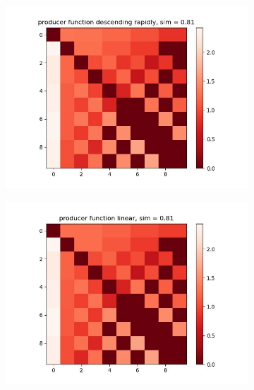 \documentclass[11pt, letterpaper]{article}
\begin{document}
\begin{figure}[h]
    \centering
\begin{adjustbox}{max width=1.5\textwidth,center}
    \begin{subfigure}[b]{0.45\textwidth}
        \includegraphics[width=\linewidth]{"figures/g/descending rapidly_heatmap.jpg"}
    \end{subfigure}
    \begin{subfigure}[b]{0.45\textwidth}
        \includegraphics[width=\linewidth]{"figures/g/linear_heatmap.jpg"}
    \end{subfigure}
    \begin{subfigure}[b]{0.45\textwidth}

\end{subfigure}
\end{adjustbox}
\end{figure}
\end{document}
